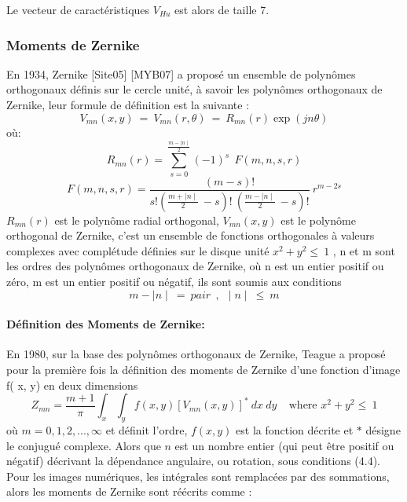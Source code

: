 Le vecteur de caractéristiques $ V_{Hu} $ est alors de taille 7.
\subsubsection{Moments de Zernike}
En 1934, Zernike [Site05] [MYB07] a proposé un ensemble de polynômes orthogonaux définis sur le cercle unité, à savoir les polynômes orthogonaux de Zernike, leur formule de définition est la suivante :
\begin{equation}
V_{mn}(x, y)~=~V_{mn}(r,\theta)~=~R_{mn}(r)\exp(jn\theta)
\end{equation}
où:
\begin{displaymath}
R_{mn}(r) = \sum_{s=0}^{\frac{m-\mid n \mid}{2}}(-1)^{s}~~F(m,n,s,r)
\end{displaymath}
\begin{displaymath}
F(m,n,s,r) = \frac{(m-s)!}{s!(\frac{m+\mid n \mid}{2}~-s)!~(\frac{m-\mid n \mid}{2}~-s)! }~r^{m-2s}
\end{displaymath}
$ R_{mn}(r) $  est le polynôme radial orthogonal, $ V_{mn}(x, y) $ est le polynôme orthogonal de Zernike, c'est un ensemble de fonctions orthogonales à valeurs complexes avec complétude définies sur le disque unité $x^{2} + y^{2} \leq ~1$ , n et m sont les ordres des polynômes orthogonaux de Zernike, où n est un entier positif ou zéro, m est un entier positif ou négatif, ils sont soumis aux conditions 
\begin{equation}
m- \mid n \mid ~=~pair~~,~~\mid n \mid~\leq~m
\end{equation}

\paragraph{Définition des Moments de Zernike:}
En 1980, sur la base des polynômes orthogonaux de Zernike, Teague a proposé pour la première fois la définition des moments de Zernike d'une fonction d'image f( x, y) en deux dimensions
\begin{equation}
Z_{mn} = \frac{m+1}{\pi} \int_{x} \int_{y} f(x,y)[V_{mn}(x,y)]^{*} ~dx~dy~~~~~\mbox{where $x^{2} + y^{2} \leq ~1$}
\end{equation}
où $m = 0,1,2,...,\infty$ et définit l'ordre, $f(x,y)$ est la fonction décrite et $*$ désigne le conjugué complexe. Alors que $n$ est un nombre entier (qui peut être positif ou négatif) décrivant la dépendance angulaire, ou rotation, sous conditions (4.4). Pour les images numériques, les intégrales sont remplacées par des sommations, alors les moments de Zernike sont réécrits comme :

